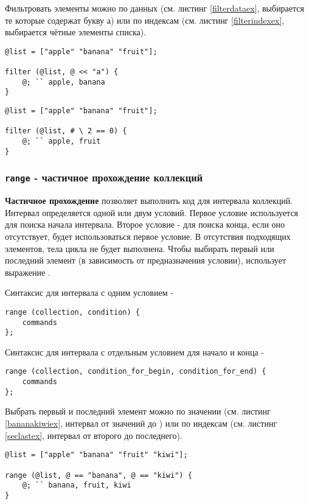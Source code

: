 \documentclass[a4paper, 14pt]{extarticle}
\begin{document}
Фильтровать элементы можно по данных (см. листинг \ref{filterdataex}, выбирается те которые содержат букву а) или по индексам (см. листинг \ref{filterindexex}, выбирается чётные элементы списка).

\begin{lstlisting}[caption=Фильтрование по данных, label=filterdataex]
@list = ["apple" "banana" "fruit"];

filter (@list, @ << "a") {
	@; `` apple, banana
}
\end{lstlisting}

\begin{lstlisting}[caption=Фильтрование по индексов, label=filterindexex]
@list = ["apple" "banana" "fruit"];

filter (@list, # \ 2 == 0) {
	@; `` apple, fruit
}
\end{lstlisting}

\subsubsection{\lstinline`range` - частичное прохождение коллекций}

{\bf Частичное прохождение} позволяет выполнить код для интервала коллекций. Интервал определяется одной или двум условий. Первое условие используется для поиска начала интервала. Второе условие - для поиска конца, если оно отсутствует, будет использоваться первое условие. В отсутствия подходящих элементов, тела цикла не будет выполнена. Чтобы выбирать первый или последний элемент (в зависимость от предназначения условии), использует выражение \true{}.

Синтаксис для интервала с одним условием -
\begin{lstlisting}[numbers=none]
range (collection, condition) {
	commands
};
\end{lstlisting}

Синтаксис для интервала с отдельным условием для начало и конца -
\begin{lstlisting}[numbers=none]
range (collection, condition_for_begin, condition_for_end) {
	commands
};
\end{lstlisting}

Выбрать первый и последний элемент можно по значении (см. листинг \ref{bananakiwiex}, интервал от значений  до ) или по индексам (см. листинг \ref{seclastex}, интервал от второго до последнего).

\begin{lstlisting}[caption=Интервал: от banana до kiwi, label=bananakiwiex]
@list = ["apple" "banana" "fruit" "kiwi"];

range (@list, @ == "banana", @ == "kiwi") {
	@; `` banana, fruit, kiwi
}
\end{lstlisting}
\end{document}
